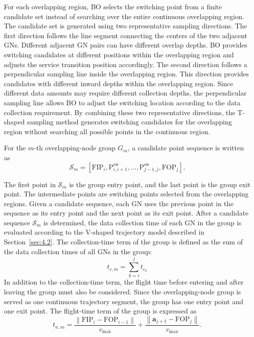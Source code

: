 \documentclass[12pt]{ksthesis}
\begin{document}
\begin{thesis}
{    For each overlapping region, BO selects the switching point from a finite candidate set instead of searching over the entire continuous overlapping region. The candidate set is generated using two representative sampling directions. The first direction follows the line segment connecting the centers of the two adjacent GNs. Different adjacent GN pairs can have different overlap depths. BO provides switching candidates at different positions within the overlapping region and adjusts the service transition position accordingly. The second direction follows a perpendicular sampling line inside the overlapping region. This direction provides candidates with different inward depths within the overlapping region. Since different data amounts may require different collection depths, the perpendicular sampling line allows BO to adjust the switching location according to the data collection requirement. By combining these two representative directions, the T-shaped sampling method generates switching candidates for the overlapping region without searching all possible points in the continuous region.

    For the \(m\)-th overlapping-node group \(G_m\), a candidate point sequence is written as
    \begin{equation}
        \mathcal{S}_m=
        \left[
        \mathrm{FIP}_i,
        \mathrm{P}^{\mathrm{sw}}_{i,i+1},
        \ldots,
        \mathrm{P}^{\mathrm{sw}}_{j-1,j},
        \mathrm{FOP}_j
        \right].
    \end{equation}

    The first point in \(\mathcal{S}_m\) is the group entry point, and the last point is the group exit point. The intermediate points are switching points selected from the overlapping regions. Given a candidate sequence, each GN uses the previous point in the sequence as its entry point and the next point as its exit point. After a candidate sequence \(\mathcal{S}_m\) is determined, the data collection time of each GN in the group is evaluated according to the V-shaped trajectory model described in Section~\ref{sec:4.2}. The collection-time term of the group is defined as the sum of the data collection times of all GNs in the group:
    \begin{equation}
        t_{c,m}=\sum_{k=i}^{j}t_{c_k}
    \end{equation}
    In addition to the collection-time term, the flight time before entering and after leaving the group must also be considered. Since the overlapping-node group is served as one continuous trajectory segment, the group has one entry point and one exit point. The flight-time term of the group is expressed as
    \begin{equation}\label{eq:time-tn_m}
        t_{n,m}
        =
        \frac{\left\|\mathrm{FIP}_i-\mathrm{FOP}_{i-1}\right\|}{v_{\max}}
        +
        \frac{\left\|\mathbf{a}_{j+1}-\mathrm{FOP}_j\right\|}{v_{\max}}.
    \end{equation}

}
\end{thesis}
\end{document}
